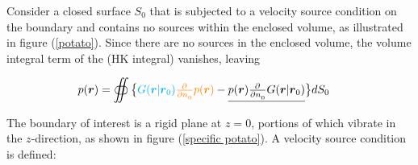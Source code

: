 \documentclass[12pt]{article}%
\begin{document}
Consider a closed surface $S_0$ that is subjected to a velocity source condition on the boundary and contains no sources within the enclosed volume, as illustrated in figure (\ref{potato}). Since there are no sources in the enclosed volume, the volume integral term of the (HK integral) vanishes, leaving

\begin{align}\label{new HK}
    p(\boldsymbol r) &= \oiint \big\lbrace \color{cyan}G(\boldsymbol r| \boldsymbol r_0) \color{orange}\pd{}{n_0} p(\boldsymbol r) \color{black}- \underline{ p(\boldsymbol r) \pd{}{n_0}  G(\boldsymbol r| \boldsymbol r_0)} \big\rbrace dS_0
\end{align}

\noindent The boundary of interest is a rigid plane at $z=0$, portions of which vibrate in the $z$-direction, as shown in figure (\ref{specific potato}).  A velocity source condition is defined:
\end{document}
